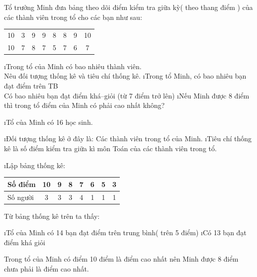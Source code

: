 \begin{bt}
	Tổ trưởng Minh đưa bảng theo dõi điểm kiểm tra giữa kỳ( theo thang điểm  ) của các thành viên trong tổ cho các bạn như sau:
	\begin{center}
		\begin{tabular}{|c c c c c c c c|}
			\hline
			10 & 3&9&9&8&8&9&10\\
			10&7&8&7&5&7&6&7\\
			\hline
		\end{tabular}
	\end{center}
	\begin{enumerate}[a),leftmargin=*]
		\i Trong tổ của Minh có bao nhiêu thành viên.\\
		Nêu đối tượng thống kê và tiêu chí thống kê.
		\i Trong tổ Minh, có bao nhiêu bạn đạt điểm trên TB\\
		Có bao nhiêu bạn đạt điểm khá--giỏi (từ  7 điểm trở lên)
		\i Nếu Minh được 8  điểm thì trong tổ điểm của Minh có phải cao nhất không?
	\end{enumerate}
	\begin{loigiaichuong42}
		\begin{enumerate}[a),leftmargin=*]
			\i Tổ của Minh có 16  học sinh.
			\begin{enumerate}[--,leftmargin=*]
				\i Đối tượng thống kê ở đây là: Các thành viên trong tổ của Minh.
				\i Tiêu chí thống kê là số điểm kiểm tra giữa kì môn Toán của các thành viên trong tổ.
			\end{enumerate}
			\i Lập bảng thống kê:
			\begin{center}
				\begin{tabular}{|l|c|c|c|c|c|c|c|}
					\hline
					Số điểm & 10 & 9&8&7&6&5&3\\
					\hline
					Số người& 3&3&3&4&1&1&1\\
					\hline
				\end{tabular}
			\end{center}	 
			Từ bảng thống kê trên ta thấy:
			\begin{enumerate}[+,leftmargin=*]
				\i Tổ của Minh có 14  bạn đạt điểm trên trung bình( trên 5 điểm)
				\i Có 13 bạn đạt điểm khá giỏi
			\end{enumerate}
			Trong tổ của Minh có điểm 10 điểm là điểm cao nhất nên Minh được 8 điểm chưa phải là điểm cao nhất.
		\end{enumerate}
	\end{loigiaichuong42}
\end{bt}
